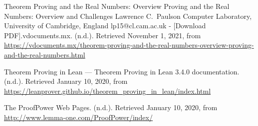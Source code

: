 \documentclass[12pt,twoside]{article}
\begin{document}
{\begin{thebibliography}{1079}
\mdbibitemlabel{}Theorem Proving and the Real Numbers: Overview Proving and the Real Numbers: Overview and Challenges Lawrence C.~Paulson Computer Laboratory, University of Cambridge, England lp15@cl.cam.ac.uk - {}[Download PDF].vdocuments.mx. (n.d.). Retrieved November 1, 2021, from \href{https://vdocuments.mx/theorem-proving-and-the-real-numbers-overview-proving-and-the-real-numbers.html}{{\ttfamily https://\hspace{0pt}vdocuments.\hspace{0pt}mx/\hspace{0pt}theorem-\hspace{0pt}proving-\hspace{0pt}and-\hspace{0pt}the-\hspace{0pt}real-\hspace{0pt}numbers-\hspace{0pt}overview-\hspace{0pt}proving-\hspace{0pt}and-\hspace{0pt}the-\hspace{0pt}real-\hspace{0pt}numbers.\hspace{0pt}html}}%

\mdbibitemlabel{}Theorem Proving in Lean — Theorem Proving in Lean 3.4.0 documentation. (n.d.). Retrieved January 10, 2020, from \href{https://leanprover.github.io/theorem_proving_in_lean/index.html}{{\ttfamily https://\hspace{0pt}leanprover.\hspace{0pt}github.\hspace{0pt}io/\hspace{0pt}theorem\_\hspace{0pt}proving\_\hspace{0pt}in\_\hspace{0pt}lean/\hspace{0pt}index.\hspace{0pt}html}}%

\mdbibitemlabel{}The ProofPower Web Pages. (n.d.). Retrieved January 10, 2020, from \href{http://www.lemma-one.com/ProofPower/index/}{{\ttfamily http://\hspace{0pt}www.\hspace{0pt}lemma-\hspace{0pt}one.\hspace{0pt}com/\hspace{0pt}ProofPower/\hspace{0pt}index/\hspace{0pt}}}%


\end{thebibliography}}
\end{document}
